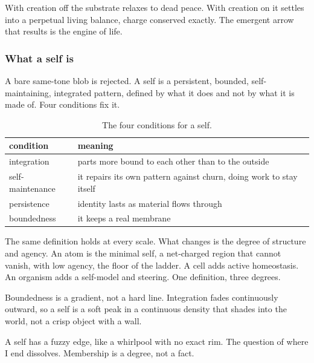 \begin{result}
With creation off the substrate relaxes to dead peace. With creation on it settles into a perpetual living balance, charge conserved exactly. The emergent arrow that results is the engine of life.
\end{result}

\subsubsection{What a self is}

A bare same-tone blob is rejected. A self is a persistent, bounded, self-maintaining, integrated pattern, defined by what it does and not by what it is made of. Four conditions fix it.

\begin{table}[ht]
\centering
\begin{tabular}{@{}ll@{}}
\toprule
condition & meaning \\
\midrule
integration & parts more bound to each other than to the outside \\
self-maintenance & it repairs its own pattern against churn, doing work to stay itself \\
persistence & identity lasts as material flows through \\
boundedness & it keeps a real membrane \\
\bottomrule
\end{tabular}
\caption{The four conditions for a self.}
\label{tab:self-conditions}
\end{table}

The same definition holds at every scale. What changes is the degree of structure and agency. An atom is the minimal self, a net-charged region that cannot vanish, with low agency, the floor of the ladder. A cell adds active homeostasis. An organism adds a self-model and steering. One definition, three degrees.

Boundedness is a gradient, not a hard line. Integration fades continuously outward, so a self is a soft peak in a continuous density that shades into the world, not a crisp object with a wall.

\begin{principle}
A self has a fuzzy edge, like a whirlpool with no exact rim. The question of where I end dissolves. Membership is a degree, not a fact.
\end{principle}

